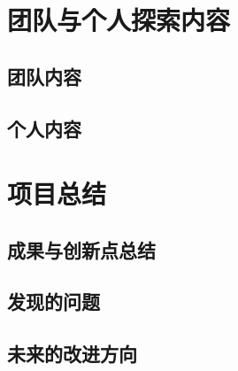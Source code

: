 \section{团队与个人探索内容}
\subsection{团队内容}
\subsection{个人内容}
\section{项目总结}
\subsection{成果与创新点总结}
\subsection{发现的问题}
\subsection{未来的改进方向}